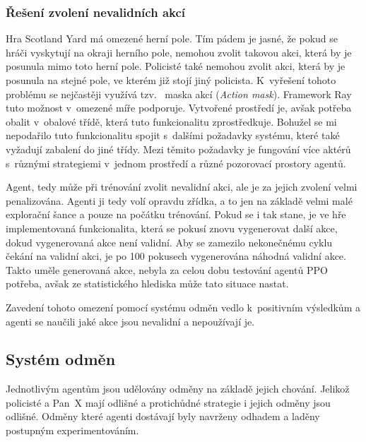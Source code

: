 \subsubsection*{Řešení zvolení nevalidních akcí}
\label{subsubsec:nevalidni_akce}

Hra Scotland Yard má omezené herní pole.
Tím pádem je jasné, že pokud se hráči vyskytují na okraji herního pole, nemohou zvolit takovou akci, která by je posunula mimo toto herní pole.
Policisté také nemohou zvolit akci, která by je posunula na stejné pole, ve kterém již stojí jiný policista.
K~vyřešení tohoto problému se nejčastěji využívá tzv.~ maska akcí (\emph{Action mask}).
Framework Ray tuto možnost v~omezené míře podporuje.
Vytvořené prostředí je, avšak potřeba obalit v~obalové třídě, která tuto funkcionalitu zprostředkuje.
Bohužel se mi nepodařilo tuto funkcionalitu spojit s~dalšími požadavky systému, které také vyžadují zabalení do jiné třídy.
Mezi těmito požadavky je fungování více aktérů s~různými strategiemi v~jednom prostředí a různé pozorovací prostory agentů.

Agent, tedy může při trénování zvolit nevalidní akci, ale je za jejich zvolení velmi penalizována.
Agenti ji tedy volí opravdu zřídka, a to jen na základě velmi malé explorační šance a pouze na počátku trénování.
Pokud se i tak stane, je ve hře implementovaná funkcionalita, která se pokusí znovu vygenerovat další akce, dokud vygenerovaná akce není validní.
Aby se zamezilo nekonečnému cyklu čekání na validní akci, je po 100 pokusech vygenerována náhodná validní akce.
Takto uměle generovaná akce, nebyla za celou dobu testování agentů PPO potřeba, avšak ze statistického hlediska může tato situace nastat.

Zavedení tohoto omezení pomocí systému odměn vedlo k~positivním výsledkům a agenti se naučili jaké akce jsou nevalidní a nepoužívají je.

\subsection{Systém odměn}
\label{subsec:odmeny}

Jednotlivým agentům jsou udělovány odměny na základě jejich chování.
Jelikož policisté a Pan~X mají odlišné a protichůdné strategie i jejich odměny jsou odlišné.
Odměny které agenti dostávají byly navrženy odhadem a laděny postupným experimentováním.

\bigskip

